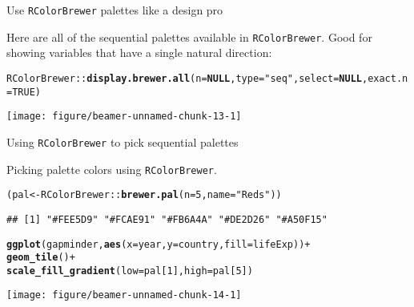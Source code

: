 \documentclass[table]{beamer}\usepackage[]{graphicx}\usepackage[]{color}
\makeatletter
\def\maxwidth{ %
  \ifdim\Gin@nat@width>\linewidth
    \linewidth
  \else
    \Gin@nat@width
  \fi
}
\newcommand{\hlnum}[1]{\textcolor[rgb]{0.686,0.059,0.569}{#1}}%
\newcommand{\hlstr}[1]{\textcolor[rgb]{0.192,0.494,0.8}{#1}}%
\newcommand{\hlopt}[1]{\textcolor[rgb]{0,0,0}{#1}}%
\newcommand{\hlstd}[1]{\textcolor[rgb]{0.345,0.345,0.345}{#1}}%
\newcommand{\hlkwa}[1]{\textcolor[rgb]{0.161,0.373,0.58}{\textbf{#1}}}%
\newcommand{\hlkwb}[1]{\textcolor[rgb]{0.69,0.353,0.396}{#1}}%
\newcommand{\hlkwc}[1]{\textcolor[rgb]{0.333,0.667,0.333}{#1}}%
\newcommand{\hlkwd}[1]{\textcolor[rgb]{0.737,0.353,0.396}{\textbf{#1}}}%
\newenvironment{kframe}{%
 \def\at@end@of@kframe{}%
 \ifinner\ifhmode%
  \def\at@end@of@kframe{\end{minipage}}%
  \begin{minipage}{\columnwidth}%
 \fi\fi%
 \def\FrameCommand##1{\hskip\@totalleftmargin \hskip-\fboxsep
 \colorbox{shadecolor}{##1}\hskip-\fboxsep
     \hskip-\linewidth \hskip-\@totalleftmargin \hskip\columnwidth}%
 \MakeFramed {\advance\hsize-\width
   \@totalleftmargin\z@ \linewidth\hsize
   \@setminipage}}%
 {\par\unskip\endMakeFramed%
 \at@end@of@kframe}
\newenvironment{knitrout}{}{} %
\makeatother
\begin{document}

\begin{frame}[fragile]{Use {\tt RColorBrewer} palettes like a design pro}

Here are all of the sequential palettes available in {\tt RColorBrewer}. Good for showing variables that have a single natural direction:
\begin{knitrout}\tiny
{}\color{fgcolor}\begin{kframe}
\begin{alltt}
\hlstd{RColorBrewer}\hlopt{::}\hlkwd{display.brewer.all}\hlstd{(}\hlkwc{n}\hlstd{=}\hlkwa{NULL}\hlstd{,} \hlkwc{type}\hlstd{=}\hlstr{"seq"}\hlstd{,} \hlkwc{select}\hlstd{=}\hlkwa{NULL}\hlstd{,} \hlkwc{exact.n}\hlstd{=}\hlnum{TRUE}\hlstd{)}
\end{alltt}
\end{kframe}

{\centering \texttt{[image: figure/beamer-unnamed-chunk-13-1]} 

}


\end{knitrout}

\end{frame}


\begin{frame}[fragile]{Using {\tt RColorBrewer} to pick sequential palettes}

Picking palette colors using {\tt RColorBrewer}.
\begin{knitrout}\tiny
{}\color{fgcolor}\begin{kframe}
\begin{alltt}
\hlstd{(pal} \hlkwb{<-} \hlstd{RColorBrewer}\hlopt{::}\hlkwd{brewer.pal}\hlstd{(}\hlkwc{n}\hlstd{=}\hlnum{5}\hlstd{,} \hlkwc{name}\hlstd{=}\hlstr{"Reds"}\hlstd{))}
\end{alltt}
\begin{verbatim}
## [1] "#FEE5D9" "#FCAE91" "#FB6A4A" "#DE2D26" "#A50F15"
\end{verbatim}
\begin{alltt}
\hlkwd{ggplot}\hlstd{(gapminder,} \hlkwd{aes}\hlstd{(}\hlkwc{x}\hlstd{=year,} \hlkwc{y}\hlstd{=country,} \hlkwc{fill}\hlstd{=lifeExp))} \hlopt{+}
    \hlkwd{geom_tile}\hlstd{()} \hlopt{+}
    \hlkwd{scale_fill_gradient}\hlstd{(}\hlkwc{low}\hlstd{=pal[}\hlnum{1}\hlstd{],} \hlkwc{high}\hlstd{=pal[}\hlnum{5}\hlstd{])}
\end{alltt}
\end{kframe}

{\centering \texttt{[image: figure/beamer-unnamed-chunk-14-1]} 

}


\end{knitrout}

\end{frame}
\end{document}
